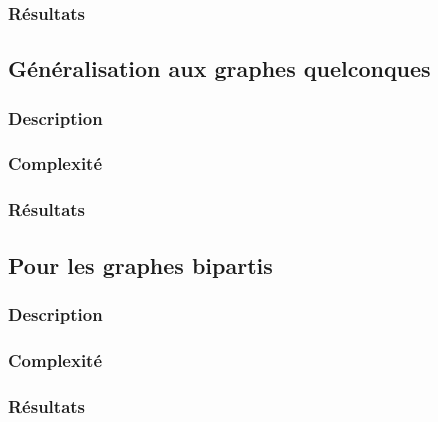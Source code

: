 \documentclass[a4paper,10pt]{article}
\begin{document}

\subsubsection{Résultats}


\subsection{Généralisation aux graphes quelconques}


\subsubsection{Description}

\subsubsection{Complexité}

\subsubsection{Résultats}


\subsection{Pour les graphes bipartis}

\subsubsection{Description}

\subsubsection{Complexité}

\subsubsection{Résultats}
\end{document}
